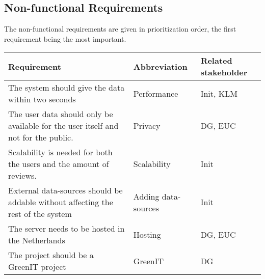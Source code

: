 \subsection*{Non-functional Requirements}
The non-functional requirements are given in prioritization order, the first requirement being the most important. 

\begin{longtable}{| p{10cm}| l | l |}
\hline
\textbf{Requirement} & \textbf{Abbreviation} & \textbf{Related stakeholder} \\ \hline
The system should give the data within two seconds & Performance & Init, KLM \\ \hline
The user data should only be available for the user itself and not for the public. & Privacy & DG, EUC \\ \hline
Scalability is needed for both the users and the amount of reviews.& Scalability & Init \\ \hline
External data-sources should be addable without affecting the rest of the system & Adding data-sources & Init \\ \hline
The server needs to be hosted in the Netherlands & Hosting & DG, EUC \\ \hline
The project should be a GreenIT project & GreenIT & DG \\ \hline
\end{longtable}
